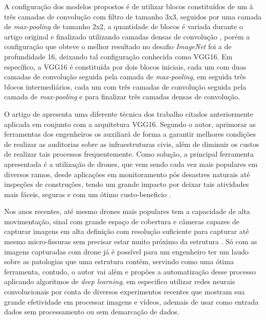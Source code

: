 A configuração dos modelos propostos é de utilizar blocos constituídos de um à três camadas de convolução com filtro de tamanho 3x3, seguidos por uma camada de \textit{max-pooling} de tamanho 2x2, a quantidade de blocos é variada durante o artigo original e finalizado utilizando camadas densas de convolução \cite{simonyan2014very}, porém a configuração que obteve o melhor resultado no desafio \textit{ImageNet} foi a de profundidade 16, deixando tal configuração conhecida como VGG16. Em específico, a VGG16 é constituída por dois blocos iniciais, cada um com duas camadas de convolução seguida pela camada de \textit{max-pooling}, em seguida três blocos intermediários, cada um com três camadas de convolução seguida pela camada de \textit{max-pooling} e para finalizar três camadas densas de convolução.


O artigo de  apresenta uma diferente técnica dos trabalho citados anteriormente aplicada em conjunto com a arquitetura VGG16. Segundo o autor, aprimorar as ferramentas dos engenheiros os auxiliará de forma a garantir melhores condições de realizar as auditorias sobre as infraestruturas civis, além de diminuir os custos de realizar tais processos frequentemente.
Como solução, a principal ferramenta apresentada é a utilização de drones, que vem sendo cada vez mais populares em diversos ramos, desde aplicações em monitoramento pós desastres naturais até inspeções de construções, tendo um grande impacto por deixar tais atividades mais fáceis, seguras e com um ótimo custo-beneficio \cite{vidyadharan2017civil}.

Nos anos recentes, até mesmo drones mais populares tem a capacidade de alta movimentação, sinal com grande espaço de cobertura e câmeras capazes de capturar imagens em alta definição com resolução suficiente para capturar até mesmo micro-fissuras sem precisar estar muito próximo da estrutura \cite{gopalakrishnan2018crack}. 
Só com as imagens capturadas com drone já é possível para um engenheiro ter um laudo sobre as patologias que uma estrutura contém, servindo como uma ótima ferramenta, contudo, o autor vai além e propões a automatização desse processo aplicando algoritmos de \textit{deep learning}, em especifico utilizar redes neurais convolucionais por conta de diversos experimentos recentes que mostram sua grande efetividade em processar imagens e vídeos, ademais de usar como entrada dados sem processamento ou sem demarcação de dados.

